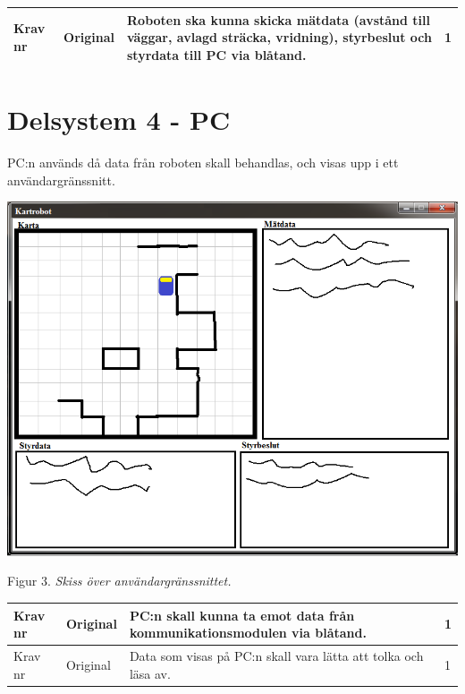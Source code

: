 \documentclass[11pt]{article}
\newcounter{kravc}
\newcommand{\kravcc}{
	\thekravc
	\stepcounter{kravc}
}
\begin{document}
\begin{flushleft}
\begin{center}
\begin{longtable}{|l|l|p{.70\linewidth}|l|}
Krav nr\kravcc &
Original &
Roboten ska kunna skicka mätdata (avstånd till väggar, avlagd sträcka, vridning), styrbeslut och styrdata till PC via blåtand. &
1 \\ \hline

\end{longtable}
\end{center}

\section{Delsystem 4 - PC}

PC:n används då data från roboten skall behandlas, och visas upp i ett användargränssnitt.
\\

\begin{center}
\includegraphics[scale=0.5]{anvandargranssnitt}

Figur 3. \textit{Skiss över användargränssnittet.}
\end{center}

\begin{center}
\begin{longtable}{|l|l|p{.70\linewidth}|l|} \hline

Krav nr\kravcc &
Original &
PC:n skall kunna ta emot data från kommunikationsmodulen via blåtand. &
1 \\ \hline

Krav nr\kravcc &
Original &
Data som visas på PC:n skall vara lätta att tolka och läsa av. &
1 \\ \hline


\end{longtable}
\end{center}
\end{flushleft}
\end{document}
